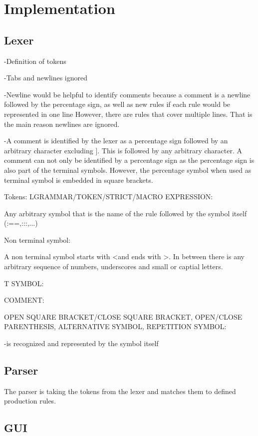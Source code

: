 

\chapter{Implementation}\label{cha:Implementation}

\section{Lexer}\label{sec:ImplementationLexer}

-Definition of tokens 

-Tabs and newlines ignored

-Newline would be helpful to identify comments because a comment is a newline followed by the percentage sign, as well as new rules if each rule would be represented in one line
However, there are rules that cover multiple lines. That is the main reason newlines are ignored. 

-A comment is identified by the lexer as a percentage sign followed by an arbitrary character excluding \dq ]\dq. This is followed by any arbitrary character. A comment can not only be identified by a percentage sign as the percentage sign is also part of the terminal symbols. However, the percentage symbol when used as terminal symbol is embedded in square brackets. 

Tokens:
LGRAMMAR/TOKEN/STRICT/MACRO EXPRESSION:

Any arbitrary symbol that is the name of the rule followed by the symbol itself (:==,:::,...)

Non terminal symbol:

A non terminal symbol starts with \dq <\dq and ends with \dq >\dq. In between there is any arbitrary sequence of numbers, underscores and small or captial letters.

T SYMBOL:

COMMENT:
        

OPEN SQUARE BRACKET/CLOSE SQUARE BRACKET, OPEN/CLOSE PARENTHESIS, ALTERNATIVE SYMBOL, REPETITION SYMBOL:

-is recognized and represented by the symbol itself


\section{Parser}\label{sec:ImplementationParser}

The parser is taking the tokens from the lexer and matches them to defined production rules.

\section{GUI}\label{sec:GUI}
